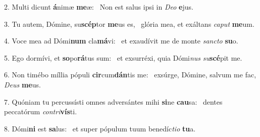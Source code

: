2. Multi dicunt \textbf{á}nimæ \textbf{me}æ: \ast\  Non est salus ipsi in \textit{De}\textit{o} \textbf{e}jus.\

3. Tu autem, Dómine, su\textbf{scép}tor \textbf{me}us es, \ast\  glória mea, et exáltans \textit{ca}\textit{put} \textbf{me}um.\

4. Voce mea ad Dómi\textbf{num} cla\textbf{má}vi: \ast\  et exaudívit me de monte \textit{sanc}\textit{to} \textbf{su}o.\

5. Ego dormívi, et \textbf{so}po\textbf{rá}tus sum: \ast\  et exsurréxi, quia Dómi\textit{nus} \textit{su}\textbf{scé}pit me.\

6. Non timébo míllia pópuli \textbf{cir}cum\textbf{dán}tis me: \ast\  exsúrge, Dómine, salvum me fac, \textit{De}\textit{us} \textbf{me}us.\

7. Quóniam tu percussísti omnes adversántes mihi \textbf{si}ne \textbf{cau}sa: \ast\  dentes peccatórum \textit{con}\textit{tri}\textbf{vís}ti.\

8. Dómi\textbf{ni} est \textbf{sa}lus: \ast\  et super pópulum tuum benedíc\textit{ti}\textit{o} \textbf{tu}a.\

